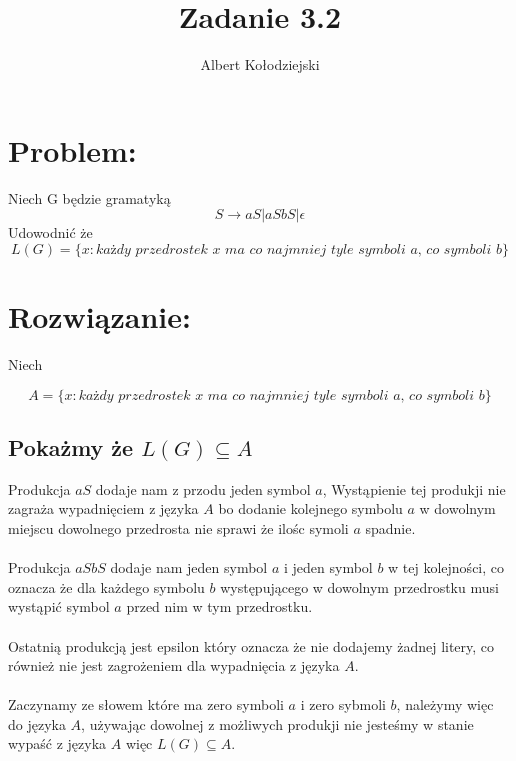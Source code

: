 \documentclass{article}
\title{Zadanie 3.2}
\author{Albert Kołodziejski}
\date{}
\begin{document}
\maketitle
\section*{Problem:}
Niech G będzie gramatyką
\[
    S \rightarrow aS|aSbS|\epsilon
\]
Udowodnić że
\[
    L(G) = \{ x: \textit{każdy przedrostek x ma co najmniej tyle symboli a, co symboli b}\}
\]
\section*{Rozwiązanie:}
Niech

\[
    A = \{ x: \textit{każdy przedrostek x ma co najmniej tyle symboli a, co symboli b}\}
\]
\subsection*{Pokażmy że $L(G) \subseteq A$}

Produkcja $aS$ dodaje nam z przodu jeden symbol $a$, Wystąpienie tej produkji nie zagraża wypadnięciem z języka $A$ bo dodanie kolejnego symbolu $a$ w dowolnym miejscu dowolnego przedrosta nie sprawi że ilośc symoli $a$ spadnie. \\
\\
Produkcja $aSbS$ dodaje nam jeden symbol $a$ i jeden symbol $b$ w tej kolejności, co oznacza że dla każdego symbolu $b$ występującego w dowolnym przedrostku musi wystąpić symbol $a$ przed nim w tym przedrostku.\\
\\
Ostatnią produkcją jest epsilon który oznacza że nie dodajemy żadnej litery, co również nie jest zagrożeniem dla wypadnięcia z języka $A$.\\
\\
Zaczynamy ze słowem które ma zero symboli $a$ i zero sybmoli $b$, należymy więc do języka $A$, używając dowolnej z możliwych produkji nie jesteśmy w stanie wypaść z języka $A$ więc $L(G) \subseteq A$.

\newpage
\end{document}
